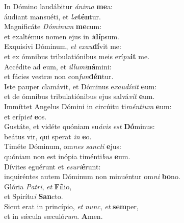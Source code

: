 \evenverse In Dómino laudábitur \textit{á}\textit{ni}\textit{ma} \textbf{me}a:~\*\\
\evenverse áudiant mansuéti, et \textit{læ}\textbf{tén}tur.\\
\oddverse Magnificáte \textit{Dó}\textit{mi}\textit{num} \textbf{me}cum:~\*\\
\oddverse et exaltémus nomen ejus in \textit{i}\textbf{dí}psum.\\
\evenverse Exquisívi Dóminum, \textit{et} \textit{e}\textit{xau}\textbf{dí}vit me:~\*\\
\evenverse et ex ómnibus tribulatiónibus meis erí\textit{pu}\textbf{it} me.\\
\oddverse Accédite ad eum, et \textit{il}\textit{lu}\textit{mi}\textbf{ná}mini:~\*\\
\oddverse et fácies vestræ non con\textit{fun}\textbf{dén}tur.\\
\evenverse Iste pauper clamávit, et Dóminus e\textit{xau}\textit{dí}\textit{vit} \textbf{e}um:~\*\\
\evenverse et de ómnibus tribulatiónibus ejus salvá\textit{vit} \textbf{e}um.\\
\oddverse Immíttet Angelus Dómini in circúitu ti\textit{mén}\textit{ti}\textit{um} \textbf{e}um:~\*\\
\oddverse et erípi\textit{et} \textbf{e}os.\\
\evenverse Gustáte, et vidéte quóniam su\textit{á}\textit{vis} \textit{est} \textbf{Dó}minus:~\*\\
\evenverse beátus vir, qui sperat \textit{in} \textbf{e}o.\\
\oddverse Timéte Dóminum, om\textit{nes} \textit{san}\textit{cti} \textbf{e}jus:~\*\\
\oddverse quóniam non est inópia timénti\textit{bus} \textbf{e}um.\\
\evenverse Dívites eguérunt et \textit{e}\textit{su}\textit{ri}\textbf{é}runt:~\*\\
\evenverse inquiréntes autem Dóminum non minuéntur om\textit{ni} \textbf{bo}no.\\
\oddverse Glória \textit{Pa}\textit{tri}, \textit{et} \textbf{Fí}lio,~\*\\
\oddverse et Spirítu\textit{i} \textbf{San}cto.\\
\evenverse Sicut erat in princípio, \textit{et} \textit{nunc}, \textit{et} \textbf{sem}per,~\*\\
\evenverse et in sǽcula sæculó\textit{rum}. \textbf{A}men.\\
